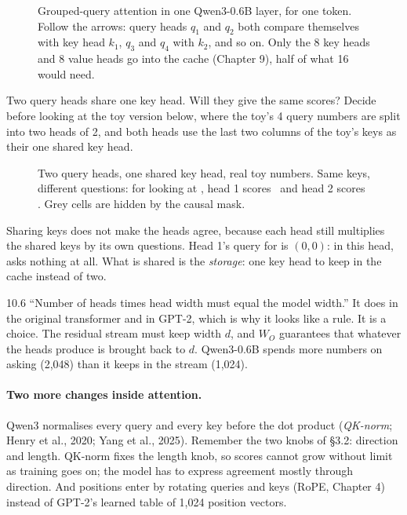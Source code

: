 \begin{figure}[!htb]
\centering

\caption{Grouped-query attention in one Qwen3-0.6B layer, for one token. Follow the arrows: query heads
$q_1$ and $q_2$ both compare themselves with key head $k_1$, $q_3$ and $q_4$ with $k_2$, and so on. Only the
8 key heads and 8 value heads go into the cache (Chapter 9), half of what 16 would need.}
\end{figure}

\Predict Two query heads share one key head. Will they give the same scores? Decide before looking at the
toy version below, where the toy's 4 query numbers are split into two heads of 2, and both heads use the
last two columns of the toy's keys as their one shared key head.

\begin{figure}[!htb]
\centering

\caption{Two query heads, one shared key head, real toy numbers. Same keys, different questions: for
 looking at , head 1 scores \nTenFigSOneTW\ and head 2 scores \nTenFigSTwoTW.
Grey cells are hidden by the causal mask.}
\end{figure}

Sharing keys does not make the heads agree, because each head still multiplies the shared keys by its own
questions. Head 1's query for  is $(0,0)$: in this head,  asks nothing at all. What is
shared is the \emph{storage}: one key head to keep in the cache instead of two.

\begin{wrongidea}{10.6}
``Number of heads times head width must equal the model width.'' It does in the original transformer and in GPT-2,
which is why it looks like a rule. It is a choice. The residual stream must keep width $d$, and $W_O$ guarantees
that whatever the heads produce is brought back to $d$. Qwen3-0.6B spends more numbers on asking (2{,}048) than it
keeps in the stream (1{,}024).
\end{wrongidea}

\paragraph{Two more changes inside attention.} Qwen3 normalises every query and every key before the dot product
(\emph{QK-norm}; Henry et al., 2020; Yang et al., 2025). Remember the two knobs of \S3.2: direction and
length. QK-norm fixes the length knob, so scores cannot grow without limit as training goes on; the model has to
express agreement mostly through direction. And positions enter by rotating queries and keys (RoPE, Chapter 4)
instead of GPT-2's learned table of 1{,}024 position vectors.

